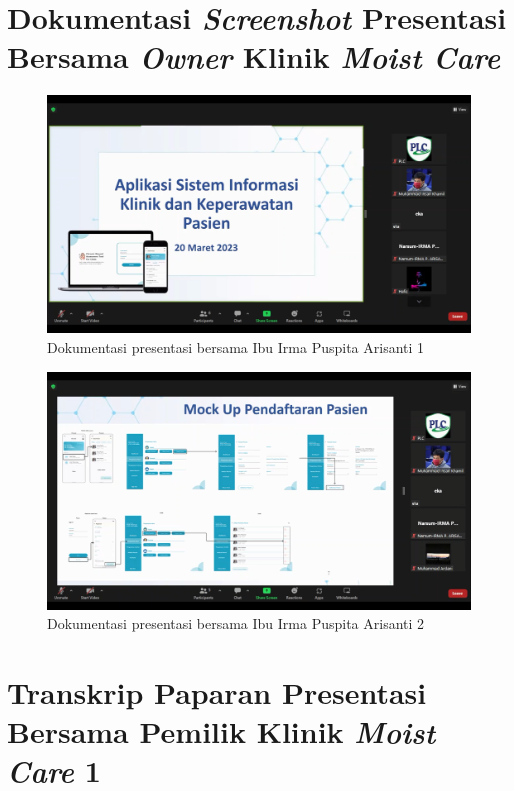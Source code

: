 \appendix

\chapter{Dokumentasi \emph{Screenshot} Presentasi Bersama \emph{Owner} Klinik \emph{Moist Care}}

\begin{figure}[H]
	\centering
	\includegraphics[width=12cm]{gambar/lampiranbuktipresentasi.png}
	\caption{Dokumentasi presentasi bersama Ibu Irma Puspita Arisanti 1} 
	\label{Gambar:usecaseadminjurnalpertama}
\end{figure}

\begin{figure}[H]
	\centering
	\includegraphics[width=12cm]{gambar/lampiranbuktipresentasi1.png}
	\caption{Dokumentasi presentasi bersama Ibu Irma Puspita Arisanti 2} 
	\label{Gambar:usecaseadminjurnalpertama}
\end{figure}

\chapter{Transkrip Paparan Presentasi Bersama Pemilik Klinik \emph{Moist Care} 1}

